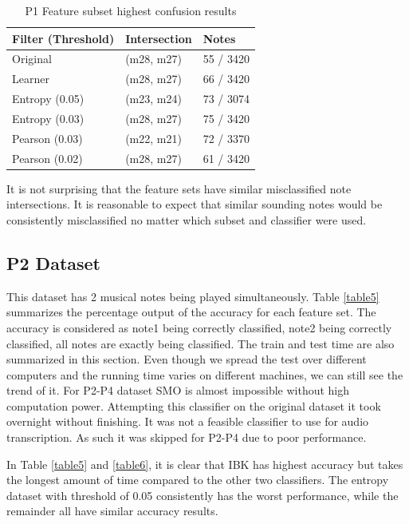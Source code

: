 \documentclass{article}
\begin{document}
\begin{table}[h]
\begin{center}
\caption{P1 Feature subset highest confusion results}
\begin{tabular}{|C{2cm}|C{2cm}|C{2cm}|}
      \hline
          Filter (Threshold)& Intersection& Notes \\
         \hline
         Original & (m28, m27)  & 55 / 3420\\
         \hline
         Learner  & (m28, m27)  & 66 / 3420\\
          \hline
         Entropy (0.05) & (m23, m24) &73 / 3074\\
         \hline
         Entropy (0.03)  & (m28, m27)  & 75 / 3420\\
         \hline
         Pearson (0.03) & (m22, m21) & 72 / 3370\\
         \hline
         Pearson (0.02)  & (m28, m27)  & 61 / 3420\\
       \hline
\end{tabular}
\end{center}
\label{table4}
\end{table}
It is not surprising that the feature sets have similar misclassified note intersections. It is reasonable to expect that similar sounding notes would be consistently misclassified no matter which subset and classifier were used. 


\subsection{P2 Dataset}
This dataset has 2 musical notes being played simultaneously. Table \ref{table5} summarizes the percentage output of the accuracy for each feature set. The accuracy is considered as note1 being correctly classified, note2 being correctly classified, all notes are exactly being classified. The train and test time are also summarized in this section. Even though we spread the test over different computers and the running time varies on different machines, we can still see the trend of it.  For P2-P4 dataset SMO is almost impossible without high computation power. Attempting this classifier on the original dataset it took overnight without finishing. It was not a feasible classifier to use for audio transcription. As such it was skipped for P2-P4 due to poor performance. 

In Table \ref{table5} and  \ref{table6}, it is clear that IBK has highest accuracy but takes the longest amount of time compared to the other two classifiers. The entropy dataset with threshold of 0.05 consistently has the worst performance, while the remainder all have similar accuracy results. 
\end{document}
